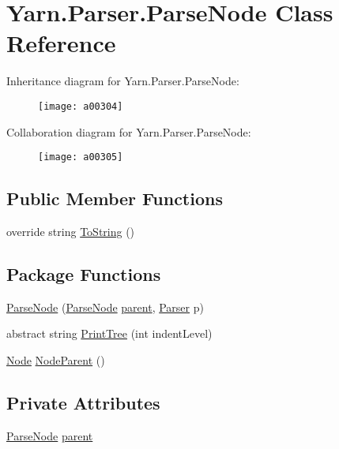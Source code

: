 \hypertarget{a00077}{\section{Yarn.\-Parser.\-Parse\-Node Class Reference}
\label{a00077}
}


Inheritance diagram for Yarn.\-Parser.\-Parse\-Node\-:
\nopagebreak
\begin{figure}[H]
\begin{center}
\leavevmode
\texttt{[image: a00304]}
\end{center}
\end{figure}


Collaboration diagram for Yarn.\-Parser.\-Parse\-Node\-:
\nopagebreak
\begin{figure}[H]
\begin{center}
\leavevmode
\texttt{[image: a00305]}
\end{center}
\end{figure}
\subsection*{Public Member Functions}
\begin{DoxyCompactItemize}
\item 
override string \hyperlink{a00077_a18c67cb16090d0889bb9d6c8c6c565f8}{To\-String} ()
\end{DoxyCompactItemize}
\subsection*{Package Functions}
\begin{DoxyCompactItemize}
\item 
\hyperlink{a00077_a9e7e90bbaed268529230512e4b5a2f77}{Parse\-Node} (\hyperlink{a00077}{Parse\-Node} \hyperlink{a00077_af313a82103fcc2ff5a177dbb06b92f7b}{parent}, \hyperlink{a00078}{Parser} p)
\item 
abstract string \hyperlink{a00077_a0d6611653f20c2e4d90a97a96c657137}{Print\-Tree} (int indent\-Level)
\item 
\hyperlink{a00068}{Node} \hyperlink{a00077_a580e520a29444fc23ac3660cbe514a09}{Node\-Parent} ()
\end{DoxyCompactItemize}
\subsection*{Private Attributes}
\begin{DoxyCompactItemize}
\item 
\hyperlink{a00077}{Parse\-Node} \hyperlink{a00077_af313a82103fcc2ff5a177dbb06b92f7b}{parent}
\end{DoxyCompactItemize}


